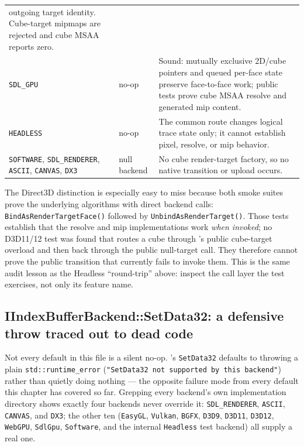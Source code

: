 \begin{longtable}{@{}p{}p{}p{}@{}}
    outgoing target identity. Cube-target mipmaps are rejected and cube MSAA reports zero. \\
\texttt{SDL\_GPU}
  & no-op & Sound: mutually exclusive 2D/cube pointers and queued per-face state preserve
    face-to-face work; public tests prove cube MSAA resolve and generated mip content. \\
\texttt{HEADLESS}
  & no-op & The common route changes logical trace state only; it cannot establish pixel,
    resolve, or mip behavior. \\
\texttt{SOFTWARE}, \texttt{SDL\_RENDERER}, \texttt{ASCII}, \texttt{CANVAS}, \texttt{DX3}
  & null backend & No cube render-target factory, so no native transition or upload occurs. \\
\bottomrule
\end{longtable}
\endgroup

The Direct3D distinction is especially easy to miss because both smoke suites prove the
underlying algorithms with direct backend calls:
\texttt{BindAsRenderTargetFace()} followed by \texttt{UnbindAsRenderTarget()}. Those tests
establish that the resolve and mip implementations work \emph{when invoked}; no D3D11/12 test
was found that routes a cube through 's public cube-target overload
and then back through the public null-target call. They therefore cannot prove the public
transition that currently fails to invoke them. This is the same audit lesson as the Headless
``round-trip'' above: inspect the call layer the test exercises, not only its feature name.

\subsection{IIndexBufferBackend::SetData32: a defensive throw traced out to dead code}

Not every default in this file is a silent no-op. 's
\texttt{SetData32} defaults to throwing a plain \texttt{std::runtime\_error}
(\texttt{"SetData32 not supported by this backend"}) rather than quietly doing nothing --- the
opposite failure mode from every default this chapter has covered so far. Grepping every
backend's own implementation directory shows exactly four backends never override it:
\texttt{SDL\_RENDERER}, \texttt{ASCII}, \texttt{CANVAS}, and \texttt{DX3}; the other ten
(\texttt{EasyGL}, \texttt{Vulkan}, \texttt{BGFX}, \texttt{D3D9}, \texttt{D3D11}, \texttt{D3D12},
\texttt{WebGPU}, \texttt{SdlGpu}, \texttt{Software}, and the internal \texttt{Headless} test
backend) all supply a real one.

